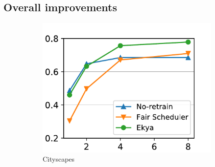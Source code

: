 


\subsection{Overall improvements}

\begin{figure}
  \centering
  \begin{subfigure}[t]{0.5\linewidth}
    \centering
    \includegraphics[width=\linewidth]{results/multicam/cityscapes_across_resources.pdf} 
    \caption{Cityscapes}
    \label{fig:scalability-gpus-cityscapes-golden}
  \end{subfigure}
  ~~~
  \begin{subfigure}[t]{0.5\linewidth}
    \centering

\end{subfigure}
\end{figure}
